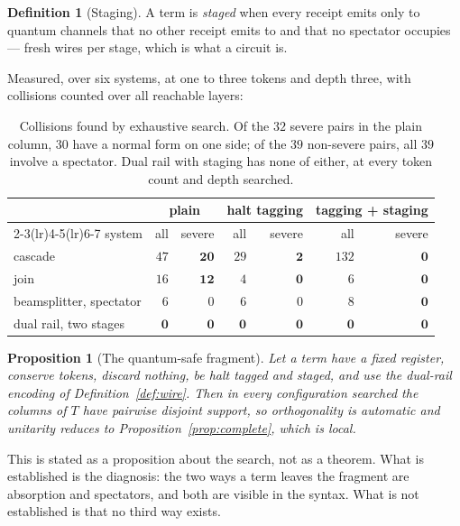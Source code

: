 \documentclass[11pt,a4paper]{article}
\theoremstyle{plain}
\newtheorem{proposition}[theorem]{Proposition}
\theoremstyle{definition}
\newtheorem{definition}[theorem]{Definition}
\theoremstyle{remark}
\begin{document}
\begin{definition}[Staging]\label{def:staging}
A term is \emph{staged} when every receipt emits only to quantum channels that
no other receipt emits to and that no spectator occupies --- fresh wires per
stage, which is what a circuit is.
\end{definition}

Measured, over six systems, at one to three tokens and depth three, with
collisions counted over all reachable layers:

\begin{table}[h]
\centering\small
\begin{tabular}{@{}lrrrrrr@{}}
\toprule
& \multicolumn{2}{c}{plain}
& \multicolumn{2}{c}{halt tagging}
& \multicolumn{2}{c}{tagging + staging}\\
\cmidrule(lr){2-3}\cmidrule(lr){4-5}\cmidrule(lr){6-7}
system & all & severe & all & severe & all & severe\\
\midrule
cascade                & $47$ & $\mathbf{20}$ & $29$ & $\mathbf{2}$ & $132$ & $\mathbf{0}$\\
join                   & $16$ & $\mathbf{12}$ & $4$  & $\mathbf{0}$ & $6$   & $\mathbf{0}$\\
beamsplitter, spectator& $6$  & $0$ & $6$ & $0$ & $8$ & $\mathbf{0}$\\
dual rail, two stages  & $\mathbf{0}$ & $\mathbf{0}$ & $\mathbf{0}$ & $\mathbf{0}$ & $\mathbf{0}$ & $\mathbf{0}$\\
\bottomrule
\end{tabular}
\caption{Collisions found by exhaustive search. Of the $32$ severe pairs in the
plain column, $30$ have a normal form on one side; of the $39$ non-severe pairs,
all $39$ involve a spectator. Dual rail with staging has none of either, at
every token count and depth searched.}\label{tab:collisions}
\end{table}

\begin{proposition}[The quantum-safe fragment]\label{prop:safe}
Let a term have a fixed register, conserve tokens, discard nothing, be halt
tagged and staged, and use the dual-rail encoding of
Definition~\ref{def:wire}. Then in every configuration searched the columns of
$T$ have pairwise disjoint support, so orthogonality is automatic and unitarity
reduces to Proposition~\ref{prop:complete}, which is local.
\end{proposition}

This is stated as a proposition about the search, not as a theorem. What is
established is the diagnosis: the two ways a term leaves the fragment are
absorption and spectators, and both are visible in the syntax. What is not
established is that no third way exists.
\end{document}
